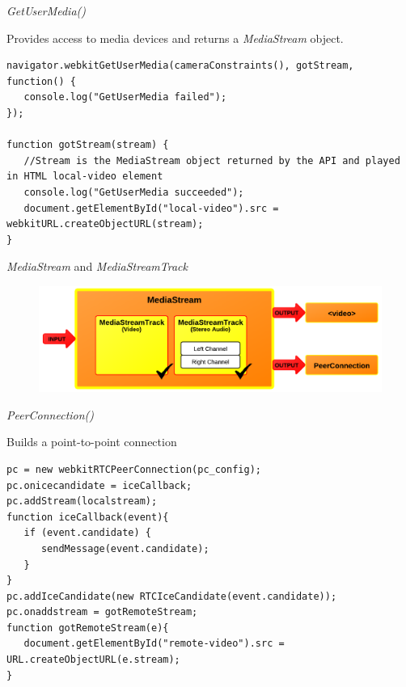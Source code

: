 \documentclass[first=red,second=purple,logo=yellowexc]{aaltoslides}
\begin{document}

\begin{frame}[fragile]{{\it GetUserMedia()}}

Provides access to media devices and returns a {\it MediaStream} object.

\lstset{language=JavaScript}
\begin{lstlisting}
navigator.webkitGetUserMedia(cameraConstraints(), gotStream, function() {
   console.log("GetUserMedia failed");
});
    
function gotStream(stream) {
   //Stream is the MediaStream object returned by the API and played in HTML local-video element
   console.log("GetUserMedia succeeded");
   document.getElementById("local-video").src = webkitURL.createObjectURL(stream);
}
\end{lstlisting}

\end{frame}

\begin{frame}[fragile]{{\it MediaStream} and {\it MediaStreamTrack}}

\begin{figure}[h]
  \centering
  \includegraphics[width=1\textwidth]{mediastreamAPI.png}
\end{figure}

\end{frame}


\begin{frame}[fragile]{{\it PeerConnection()}}

Builds a point-to-point connection
\lstset{language=JavaScript}
\begin{lstlisting}
pc = new webkitRTCPeerConnection(pc_config);
pc.onicecandidate = iceCallback;
pc.addStream(localstream);
function iceCallback(event){
   if (event.candidate) {
      sendMessage(event.candidate);
   }
}
pc.addIceCandidate(new RTCIceCandidate(event.candidate));
pc.onaddstream = gotRemoteStream; 
function gotRemoteStream(e){
   document.getElementById("remote-video").src = URL.createObjectURL(e.stream);
}
\end{lstlisting}

\end{frame}
\end{document}
